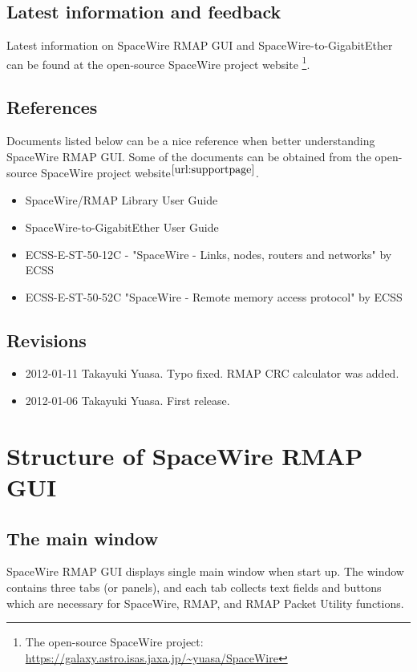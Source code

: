 \documentclass[a4paper,10pt]{article}
\begin{document}
\subsection{Latest information and feedback}
Latest information on SpaceWire RMAP GUI and SpaceWire-to-GigabitEther can be found at the open-source SpaceWire project website \footnote{The open-source SpaceWire project: \url{https://galaxy.astro.isas.jaxa.jp/~yuasa/SpaceWire}\label{url:supportpage}}.

\subsection{References}
Documents listed below can be a nice reference when better understanding SpaceWire RMAP GUI. Some of the documents can be obtained from the open-source SpaceWire project website$^\mathrm{\ref{url:supportpage}}$.
\begin{itemize}
  \setlength{\parskip}{0cm}
  \setlength{\itemsep}{0cm}
\item SpaceWire/RMAP Library User Guide
\item SpaceWire-to-GigabitEther User Guide
\item ECSS-E-ST-50-12C - "SpaceWire - Links, nodes, routers and networks" by ECSS
\item ECSS-E-ST-50-52C "SpaceWire - Remote memory access protocol" by ECSS
\end{itemize}

\subsection{Revisions}
\begin{itemize}
  \setlength{\parskip}{0cm}
  \setlength{\itemsep}{0cm}
\item 2012-01-11 Takayuki Yuasa. Typo fixed. RMAP CRC calculator was added.
\item 2012-01-06 Takayuki Yuasa. First release.
\end{itemize}



\section{Structure of SpaceWire RMAP GUI}

\subsection{The main window}
SpaceWire RMAP GUI displays single main window when start up.
The window contains three tabs (or panels), and each tab collects text fields and buttons which are necessary for SpaceWire, RMAP, and RMAP Packet Utility functions.
\end{document}

